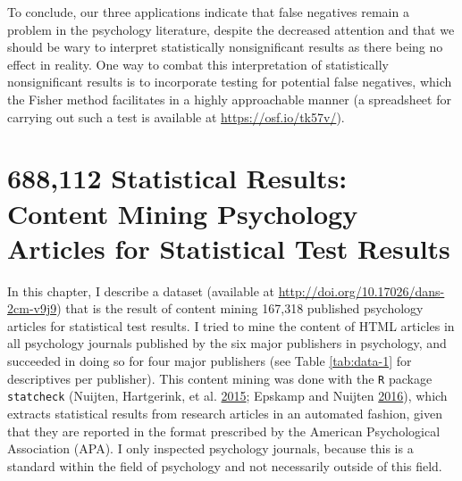 \documentclass[a5paper]{book}
\begin{document}
To conclude, our three applications indicate that false negatives remain
a problem in the psychology literature, despite the decreased attention
and that we should be wary to interpret statistically nonsignificant
results as there being no effect in reality. One way to combat this
interpretation of statistically nonsignificant results is to incorporate
testing for potential false negatives, which the Fisher method
facilitates in a highly approachable manner (a spreadsheet for carrying
out such a test is available at \url{https://osf.io/tk57v/}).

\chapter{688,112 Statistical Results: Content Mining Psychology Articles
for Statistical Test
Results}\label{statistical-results-content-mining-psychology-articles-for-statistical-test-results}

In this chapter, I describe a dataset (available at
\url{http://doi.org/10.17026/dans-2cm-v9j9}) that is the result of
content mining 167,318 published psychology articles for statistical
test results. I tried to mine the content of HTML articles in all
psychology journals published by the six major publishers in psychology,
and succeeded in doing so for four major publishers (see Table
\ref{tab:data-1} for descriptives per publisher). This content mining
was done with the \texttt{R} package \texttt{statcheck} (Nuijten,
Hartgerink, et al.
\protect\hyperlink{ref-doi:10.3758ux2fs13428-015-0664-2}{2015}; Epskamp
and Nuijten \protect\hyperlink{ref-statcheck}{2016}), which extracts
statistical results from research articles in an automated fashion,
given that they are reported in the format prescribed by the American
Psychological Association (APA). I only inspected psychology journals,
because this is a standard within the field of psychology and not
necessarily outside of this field.
\end{document}
